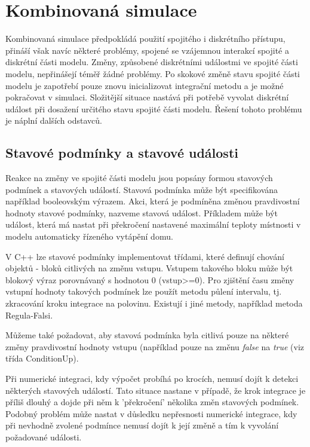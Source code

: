 \documentclass[a4paper]{article}
\begin{document}
\section{Kombinovaná simulace}

Kombinovaná simulace předpokládá použití spojitého i diskrétního
přístupu, přináší však navíc některé problémy, spojené se
vzájemnou interakcí spojité a diskrétní části modelu. Změny,
způsobené diskrétními událostmi ve spojité části modelu,
nepřinášejí téměř žádné problémy. Po skokové změně stavu spojité
části modelu je zapotřebí pouze znovu inicializovat integrační
metodu a je možné pokračovat v simulaci. Složitější situace
nastává při potřebě vyvolat diskrétní událost při dosažení
určitého stavu spojité části modelu. Řešení tohoto problému je
náplní dalších odstavců.


\subsection{Stavové podmínky a stavové události}

Reakce na změny ve spojité části modelu jsou popsány formou
stavových podmínek a stavových událostí. Stavová podmínka může
být specifikována například booleovským výrazem. Akci, která je
podmíněna změnou pravdivostní hodnoty stavové podmínky, nazveme
stavová událost. Příkladem může být událost, která má nastat při
překročení nastavené maximální teploty místnosti v modelu
automaticky řízeného vytápění domu.

V C++ lze stavové podmínky implementovat třídami, které definují
chování objektů - bloků citlivých na změnu vstupu. Vstupem
takového bloku může být blokový výraz porovnávaný s hodnotou 0
(vstup>=0).
 Pro zjištění času
změny vstupní hodnoty takových podmínek lze použít
metodu půlení intervalu, tj. zkracování kroku integrace na
polovinu. Existují i jiné metody, například metoda
Regula-Falsi.

Můžeme také požadovat, aby stavová podmínka byla citlivá pouze
na některé změny pravdivostní hodnoty vstupu (například pouze na
změnu \emph{false} na \emph{true} (viz třída ConditionUp).

Při numerické integraci, kdy výpočet probíhá po krocích, nemusí
dojít k detekci některých stavových událostí. Tato situace
nastane v případě, že krok integrace je příliš dlouhý a dojde
při něm k 'překročení' několika změn stavových podmínek. Podobný
problém může nastat v důsledku nepřesnosti numerické integrace,
kdy při nevhodně zvolené podmínce nemusí dojít k její změně
a tím k vyvolání požadované události.
\end{document}
